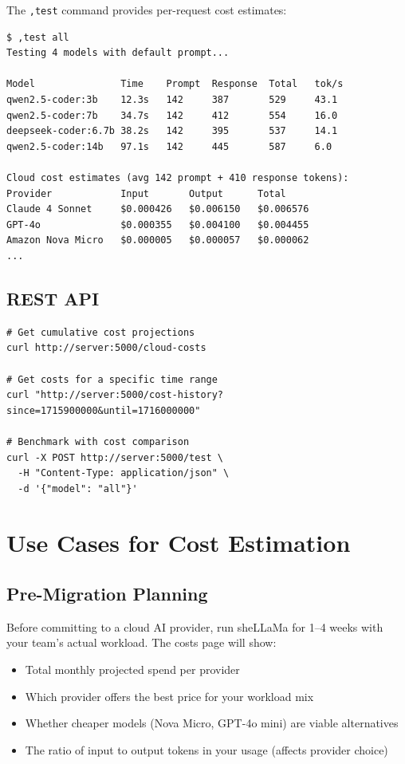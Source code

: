 \documentclass[11pt,a4paper]{article}
\begin{document}
The \texttt{,test} command provides per-request cost estimates:

\begin{lstlisting}[caption={CLI benchmark with cost estimates}]
$ ,test all
Testing 4 models with default prompt...

Model               Time    Prompt  Response  Total   tok/s
qwen2.5-coder:3b    12.3s   142     387       529     43.1
qwen2.5-coder:7b    34.7s   142     412       554     16.0
deepseek-coder:6.7b 38.2s   142     395       537     14.1
qwen2.5-coder:14b   97.1s   142     445       587     6.0

Cloud cost estimates (avg 142 prompt + 410 response tokens):
Provider            Input       Output      Total
Claude 4 Sonnet     $0.000426   $0.006150   $0.006576
GPT-4o              $0.000355   $0.004100   $0.004455
Amazon Nova Micro   $0.000005   $0.000057   $0.000062
...
\end{lstlisting}

\subsection{REST API}

\begin{lstlisting}[caption={Cost estimation via API}]
# Get cumulative cost projections
curl http://server:5000/cloud-costs

# Get costs for a specific time range
curl "http://server:5000/cost-history?since=1715900000&until=1716000000"

# Benchmark with cost comparison
curl -X POST http://server:5000/test \
  -H "Content-Type: application/json" \
  -d '{"model": "all"}'
\end{lstlisting}

\section{Use Cases for Cost Estimation}

\subsection{Pre-Migration Planning}

Before committing to a cloud AI provider, run sheLLaMa for 1--4 weeks with your team's actual workload. The costs page will show:

\begin{itemize}
  \item Total monthly projected spend per provider
  \item Which provider offers the best price for your workload mix
  \item Whether cheaper models (Nova Micro, GPT-4o mini) are viable alternatives
  \item The ratio of input to output tokens in your usage (affects provider choice)
\end{itemize}
\end{document}
